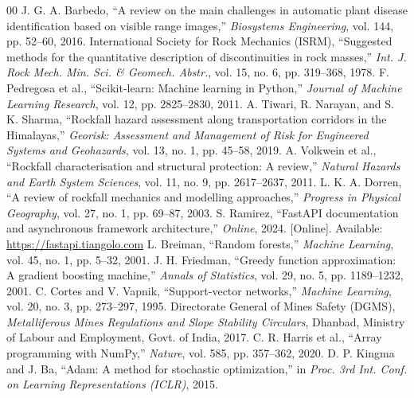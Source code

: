 \documentclass[conference]{IEEEtran}
\begin{document}
\begin{thebibliography}{00}
 J. G. A. Barbedo, ``A review on the main challenges in automatic plant disease identification based on visible range images,'' \textit{Biosystems Engineering}, vol. 144, pp. 52--60, 2016.
 International Society for Rock Mechanics (ISRM), ``Suggested methods for the quantitative description of discontinuities in rock masses,'' \textit{Int. J. Rock Mech. Min. Sci. \& Geomech. Abstr.}, vol. 15, no. 6, pp. 319--368, 1978.
 F. Pedregosa et al., ``Scikit-learn: Machine learning in Python,'' \textit{Journal of Machine Learning Research}, vol. 12, pp. 2825--2830, 2011.
 A. Tiwari, R. Narayan, and S. K. Sharma, ``Rockfall hazard assessment along transportation corridors in the Himalayas,'' \textit{Georisk: Assessment and Management of Risk for Engineered Systems and Geohazards}, vol. 13, no. 1, pp. 45--58, 2019.
 A. Volkwein et al., ``Rockfall characterisation and structural protection: A review,'' \textit{Natural Hazards and Earth System Sciences}, vol. 11, no. 9, pp. 2617--2637, 2011.
 L. K. A. Dorren, ``A review of rockfall mechanics and modelling approaches,'' \textit{Progress in Physical Geography}, vol. 27, no. 1, pp. 69--87, 2003.
 S. Ramirez, ``FastAPI documentation and asynchronous framework architecture,'' \textit{Online}, 2024. [Online]. Available: \url{https://fastapi.tiangolo.com}
 L. Breiman, ``Random forests,'' \textit{Machine Learning}, vol. 45, no. 1, pp. 5--32, 2001.
 J. H. Friedman, ``Greedy function approximation: A gradient boosting machine,'' \textit{Annals of Statistics}, vol. 29, no. 5, pp. 1189--1232, 2001.
 C. Cortes and V. Vapnik, ``Support-vector networks,'' \textit{Machine Learning}, vol. 20, no. 3, pp. 273--297, 1995.
 Directorate General of Mines Safety (DGMS), \textit{Metalliferous Mines Regulations and Slope Stability Circulars}, Dhanbad, Ministry of Labour and Employment, Govt. of India, 2017.
 C. R. Harris et al., ``Array programming with NumPy,'' \textit{Nature}, vol. 585, pp. 357--362, 2020.
 D. P. Kingma and J. Ba, ``Adam: A method for stochastic optimization,'' in \textit{Proc. 3rd Int. Conf. on Learning Representations (ICLR)}, 2015.
\end{thebibliography}
\end{document}
